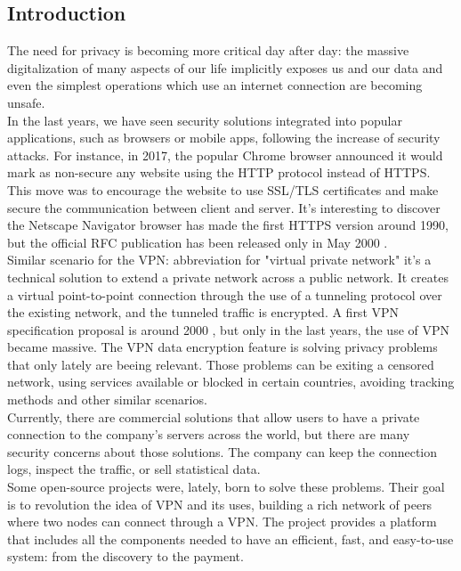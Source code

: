 \documentclass[]{article}
\begin{document}
	\subsection{Introduction}
	The need for privacy is becoming more critical day after day: the massive digitalization of many aspects of our life implicitly exposes us and our data and even the simplest operations which use an internet connection are becoming unsafe.\\
    In the last years, we have seen security solutions integrated into popular applications, such as browsers or mobile apps, following the increase of security attacks. For instance, in 2017, the popular Chrome browser announced it would mark as non-secure any website using the HTTP protocol instead of HTTPS. This move was to encourage the website to use SSL/TLS certificates and make secure the communication between client and server. It's interesting to discover the Netscape Navigator browser has made the first HTTPS version around 1990, but the official RFC publication has been released only in May 2000 \cite{HTTPS}.\\
	Similar scenario for the VPN: abbreviation for "virtual private network" it's a technical solution to extend a private network across a public network. It creates a virtual point-to-point connection through the use of a tunneling protocol over the existing network, and the tunneled traffic is encrypted. A first VPN specification proposal is around 2000 \cite{VPNRFC}, but only in the last years, the use of VPN became massive. The VPN data encryption feature is solving privacy problems that only lately are beeing relevant. Those problems can be exiting a censored network, using services available or blocked in certain countries, avoiding tracking methods and other similar scenarios.\\
	Currently, there are commercial solutions that allow users to have a private connection to the company's servers across the world, but there are many security concerns about those solutions. The company can keep the connection logs, inspect the traffic, or sell statistical data.\\
    Some open-source projects were, lately, born to solve these problems. Their goal is to revolution the idea of VPN and its uses, building a rich network of peers where two nodes can connect through a VPN. The project provides a platform that includes all the components needed to have an efficient, fast, and easy-to-use system: from the discovery to the payment.\\
    
\end{document}
